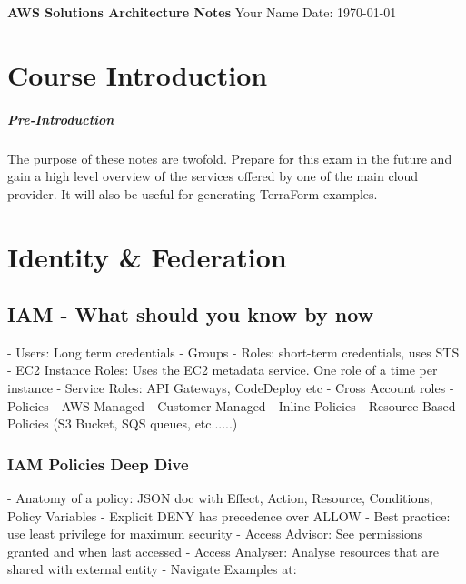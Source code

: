 \documentclass[11pt]{book}
\begin{document}
    \begin{titlepage}
        \centering
        \vspace*{2in}
        \Huge \textbf{AWS Solutions Architecture Notes}
        \vfill
        \Large Your Name
        \vfill
        \Large Date: \today
    \end{titlepage}

    \newpage

    \tableofcontents
    \newpage


    \chapter{Course Introduction}

    \paragraph{Pre-Introduction}
    The purpose of these notes are twofold.
    Prepare for this exam in the future and gain a high level overview of the services offered by one of the main cloud provider.
    It will also be useful for generating TerraForm examples.


    \chapter{Identity \& Federation}

    \section{IAM - What should you know by now}
    - Users: Long term credentials
    - Groups
    - Roles: short-term credentials, uses STS
    - EC2 Instance Roles: Uses the EC2 metadata service. One role of a time per instance
    - Service Roles: API Gateways, CodeDeploy etc
    - Cross Account roles
    - Policies
    - AWS Managed
    - Customer Managed
    - Inline Policies
    - Resource Based Policies (S3 Bucket, SQS queues, etc......)

    \subsection{IAM Policies Deep Dive}
    - Anatomy of a policy: JSON doc with Effect, Action, Resource, Conditions, Policy Variables
    - Explicit DENY has precedence over ALLOW
    - Best practice: use least privilege for maximum security
    - Access Advisor: See permissions granted and when last accessed
    - Access Analyser: Analyse resources that are shared with external entity
    - Navigate Examples at: %
\end{document}
